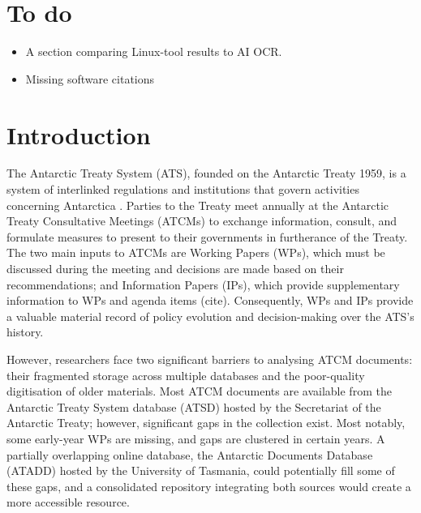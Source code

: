 \documentclass[12pt]{article}
\newcommand{\m}[0]{\color{maroon}}
\begin{document}
\section{To do}

\begin{itemize}
    \item A section comparing Linux-tool results to AI OCR.
    \item Missing software citations
\end{itemize}

\section{Introduction}

The Antarctic Treaty System (ATS), founded on the Antarctic Treaty 1959, 
is a system of interlinked regulations and institutions that govern activities concerning Antarctica 
\citep{barrett2020antarctic}. 
Parties to the Treaty meet annually at the Antarctic Treaty Consultative Meetings (ATCMs) 
to exchange information, consult, and formulate measures 
to present to their governments in furtherance of the Treaty. 
The two main inputs to ATCMs are
Working Papers (WPs),
which must be discussed during the meeting
and decisions are made based on their recommendations;
and Information Papers (IPs),
which provide supplementary information to WPs and agenda items 
({\m cite}). %
Consequently, WPs and IPs 
provide a valuable material record of 
policy evolution and decision-making
over the ATS's history.

However,
researchers face two significant barriers to analysing ATCM documents:
their fragmented storage across multiple databases
and the poor-quality digitisation of older materials.
Most ATCM documents are available from the Antarctic Treaty System database (ATSD)
hosted by the Secretariat of the Antarctic Treaty; however, significant gaps in the collection exist. 
Most notably, some early-year WPs are missing,
and gaps are clustered in certain years.
A partially overlapping online database, 
the Antarctic Documents Database (ATADD) hosted by the University of Tasmania,
could potentially fill some of these gaps,
and a consolidated repository integrating both sources
would create a more accessible resource.
\end{document}
